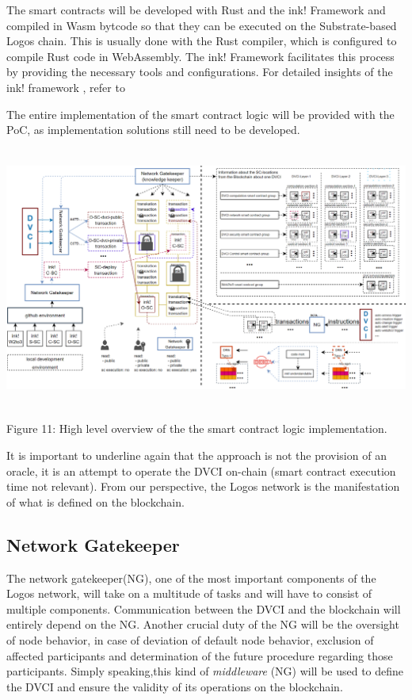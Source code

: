 \documentclass[]{article}
\begin{document}
The smart contracts will be developed with Rust \cite{rust-book} and the ink! Framework and compiled in Wasm bytcode so that they can be executed on the Substrate-based Logos chain. 
This is usually done with the Rust compiler, which is configured to compile Rust code in WebAssembly. 
The ink! Framework facilitates this process by providing the necessary tools and configurations.
For detailed insights of the ink! framework , refer to \cite{ink!articl}

The entire implementation of the smart contract logic will be provided with the PoC, as implementation solutions still need to be developed.   

\begin{center}
	\includegraphics[height=8.6cm]{smart-contract-logic}
\end{center}
\begin{center}
	Figure 11: High level overview of the the smart contract logic implementation.
\end{center}

It is important to underline again that the approach is not the provision of an oracle, it is an attempt to operate the DVCI on-chain (smart contract execution time not relevant). 
From our perspective, the Logos network is the manifestation of what is defined on the blockchain.

\subsection{Network Gatekeeper}
The network gatekeeper(NG), one of the most important components of the Logos network, will take on a multitude of tasks and will have to consist of multiple components. 
Communication between the DVCI and the blockchain will entirely depend on the NG. 
Another crucial duty of the NG will be the oversight of node behavior, in case of deviation of default node behavior, exclusion of affected participants and determination of the future procedure regarding those participants.
Simply speaking,this kind of \textit{middleware} (NG) will be used to define the DVCI and ensure the validity of its operations on the blockchain.  
\end{document}
